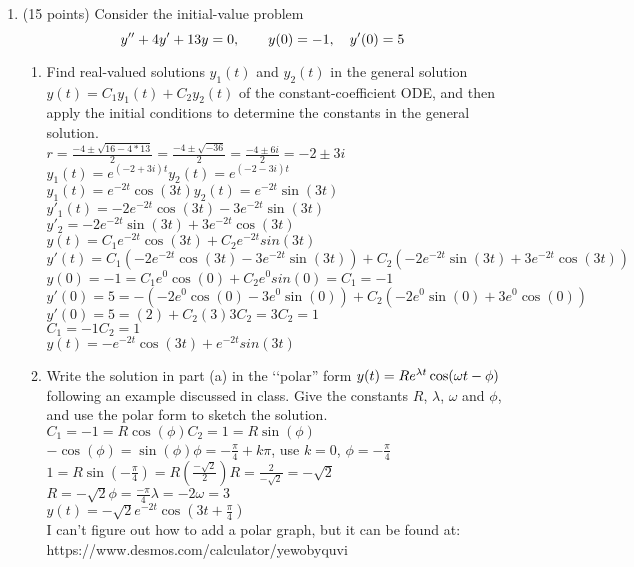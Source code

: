\documentclass{article}
\begin{document}
\begin{enumerate}
\item (15 points)  Consider the initial-value problem
\[
y\sp{\prime\prime}+4y\sp\prime+13y=0,\qquad y(0)=-1,\quad y\sp\prime(0)=5
\]
\begin{enumerate}
\item Find real-valued solutions $y_1(t)$ and $y_2(t)$ in the general solution $y(t)=C_1y_1(t)+C_2y_2(t)$ of the constant-coefficient ODE, and then apply the initial conditions to determine the constants in the general solution.
\\$r=\frac{-4\pm\sqrt{16-4*13}}{2}=\frac{-4\pm\sqrt{-36}}{2}=\frac{-4\pm6i}{2}=-2\pm3i$
\\$y_1(t)=e^{(-2+3i)t}$\qquad$y_2(t)=e^{(-2-3i)t}$
\\$y_1(t)=e^{-2t}\cos(3t)$\qquad$y_2(t)=e^{-2t}\sin(3t)$
\\$y'_1(t)=-2e^{-2t}\cos(3t)-3e^{-2t}\sin(3t)$\qquad$y'_2=-2e^{-2t}\sin(3t)+3e^{-2t}\cos(3t)$
\\$y(t)=C_1e^{-2t}\cos(3t)+C_2e^{-2t}sin(3t)$
\\$y'(t)=C_1(-2e^{-2t}\cos(3t)-3e^{-2t}\sin(3t))+C_2(-2e^{-2t}\sin(3t)+3e^{-2t}\cos(3t))$
\\$y(0)=-1=C_1e^0\cos(0)+C_2e^0sin(0)=C_1=-1$
\\$y'(0)=5=-(-2e^0\cos(0)-3e^0\sin(0))+C_2(-2e^0\sin(0)+3e^0\cos(0))$
\\$y'(0)=5=(2)+C_2(3)$\qquad$3C_2=3$\qquad$C_2=1$
\\$C_1=-1$\qquad$C_2=1$
\\$y(t)=-e^{-2t}\cos(3t)+e^{-2t}sin(3t)$
\item Write the solution in part (a) in the \lq\lq polar'' form $y(t)=Re\sp{\lambda t}\cos(\omega t-\phi)$ following an example discussed in class.  Give the constants $R$, $\lambda$, $\omega$ and $\phi$, and use the polar form to sketch the solution.
\\$C_1=-1=R\cos(\phi)$\qquad$C_2=1=R\sin(\phi)$
\\$-\cos(\phi)=\sin(\phi)$\qquad$\phi=-\frac{\pi}{4}+k\pi$, use $k=0$, $\phi=-\frac{\pi}{4}$
\\$1=R\sin(-\frac{\pi}{4})=R(\frac{-\sqrt{2}}{2})$\qquad$R=\frac{2}{-\sqrt{2}}=-\sqrt{2}$
\\$R=-\sqrt{2}$\qquad$\phi=\frac{-\pi}{4}$\qquad$\lambda=-2$\qquad$\omega=3$
\\$y(t)=-\sqrt{2}e^{-2t}\cos(3t+\frac{\pi}{4})$
\\I can't figure out how to add a polar graph, but it can be found at:
\\https://www.desmos.com/calculator/yewobyquvi
\end{enumerate}



\end{enumerate}
\end{document}
